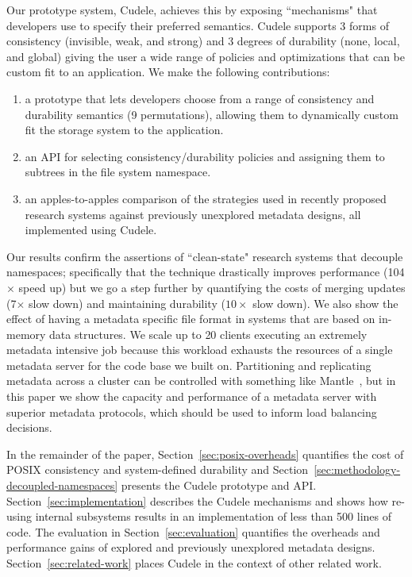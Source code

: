 Our prototype system, Cudele, achieves this by exposing ``mechanisms" that
developers use to specify their preferred semantics.  Cudele supports 3 forms
of consistency (invisible, weak, and strong) and 3 degrees of durability (none,
local, and global) giving the user a wide range of policies and optimizations
that can be custom fit to an application. We make the following contributions:

\begin{enumerate}

  \item a prototype that lets developers choose from a range of
  consistency and durability semantics (9 permutations), allowing them to dynamically custom
  fit the storage system to the application.

  \item an API for selecting consistency/durability policies and assigning
  them to subtrees in the file system namespace.

  \item an apples-to-apples comparison of the strategies used in recently proposed research systems against
  previously unexplored metadata designs, all implemented using Cudele.

\end{enumerate}

Our results confirm the assertions of ``clean-state" research systems that
decouple namespaces; specifically that the technique drastically improves
performance (104\(\times\) speed up) but we go a step further by quantifying
the costs of merging updates (7\(\times\) slow down) and maintaining durability
(\(10\times\) slow down). We also show the effect of having a metadata specific
file format in systems that are based on in-memory data structures.  We scale
up to 20 clients executing an extremely metadata intensive job because this
workload exhausts the resources of a single metadata server for the code base we
built on.  Partitioning and replicating metadata across a cluster can be
controlled with something like Mantle~\cite{sevilla:sc15-mantle}, but in this
paper we show the capacity and performance of a metadata server with superior
metadata protocols, which should be used to inform load balancing decisions.

In the remainder of the paper, Section~\ref{sec:posix-overheads} quantifies the
cost of POSIX consistency and system-defined durability and
Section~\ref{sec:methodology-decoupled-namespaces} presents the Cudele
prototype and API. Section~\ref{sec:implementation} describes the Cudele
mechanisms and shows how re-using internal subsystems results in an
implementation of less than 500 lines of code. The evaluation in
Section~\ref{sec:evaluation} quantifies the overheads and performance gains of
explored and previously unexplored metadata designs.
Section~\ref{sec:related-work} places Cudele in the context of other related
work.

